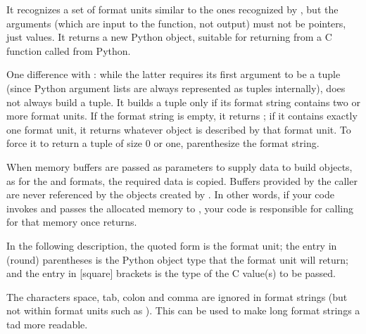 \documentclass{manual}
\begin{document}
It recognizes a set of format units similar to the ones recognized by
, but the arguments (which are input to the
function, not output) must not be pointers, just values.  It returns a
new Python object, suitable for returning from a C function called
from Python.

One difference with : while the latter
requires its first argument to be a tuple (since Python argument lists
are always represented as tuples internally),
 does not always build a tuple.  It builds
a tuple only if its format string contains two or more format units.
If the format string is empty, it returns ; if it contains
exactly one format unit, it returns whatever object is described by
that format unit.  To force it to return a tuple of size 0 or one,
parenthesize the format string.

When memory buffers are passed as parameters to supply data to build
objects, as for the  and  formats, the required data
is copied.  Buffers provided by the caller are never referenced by the
objects created by .  In other words, if
your code invokes  and passes the allocated memory
to , your code is responsible for
calling  for that memory once
 returns.

In the following description, the quoted form is the format unit; the
entry in (round) parentheses is the Python object type that the format
unit will return; and the entry in [square] brackets is the type of
the C value(s) to be passed.

The characters space, tab, colon and comma are ignored in format
strings (but not within format units such as ).  This can be
used to make long format strings a tad more readable.
\end{document}
